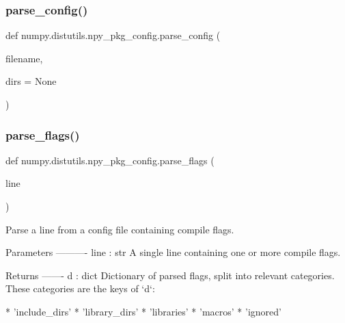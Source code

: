 \subsubsection{\texorpdfstring{parse\+\_\+config()}{parse\_config()}}
{\footnotesize\ttfamily def numpy.\+distutils.\+npy\+\_\+pkg\+\_\+config.\+parse\+\_\+config (\begin{DoxyParamCaption}\item[{}]{filename,  }\item[{}]{dirs = {\ttfamily None} }\end{DoxyParamCaption})}

\mbox{\label{namespacenumpy_1_1distutils_1_1npy__pkg__config_a6c9fdcbb0ade8da593d7f9288f6a5cd9}} 
\subsubsection{\texorpdfstring{parse\+\_\+flags()}{parse\_flags()}}
{\footnotesize\ttfamily def numpy.\+distutils.\+npy\+\_\+pkg\+\_\+config.\+parse\+\_\+flags (\begin{DoxyParamCaption}\item[{}]{line }\end{DoxyParamCaption})}

\begin{DoxyVerb}Parse a line from a config file containing compile flags.

Parameters
----------
line : str
    A single line containing one or more compile flags.

Returns
-------
d : dict
    Dictionary of parsed flags, split into relevant categories.
    These categories are the keys of `d`:

    * 'include_dirs'
    * 'library_dirs'
    * 'libraries'
    * 'macros'
    * 'ignored'\end{DoxyVerb}
 \mbox{\label{namespacenumpy_1_1distutils_1_1npy__pkg__config_a4ac1edb29dd82acb1851e242ed2393e3}} 
